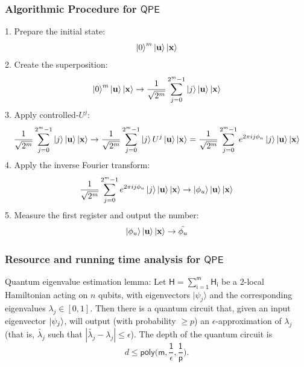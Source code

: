 \documentclass[11pt]{article}
\begin{document}
\subsubsection{Algorithmic Procedure for $\mathsf{QPE}$}
1. Prepare the initial state: $$\ket{0}^m\ket{\mathbf{u}}\ket{\mathbf{x}}$$
2. Create the superposition: $$\ket{0}^m\ket{\mathbf{u}}\ket{\mathbf{x}} \rightarrow  \frac{1}{\sqrt{2^m}} \sum_{j=0}^{2^m-1}\ket{j}\ket{\mathbf{u}}\ket{\mathbf{x}}$$
3. Apply controlled-$U^j$: $$\frac{1}{\sqrt{2^m}} \sum_{j=0}^{2^m-1}\ket{j}\ket{\mathbf{u}}\ket{\mathbf{x}} \rightarrow \frac{1}{\sqrt{2^m}} \sum_{j=0}^{2^m-1}\ket{j}U^j\ket{\mathbf{u}}\ket{\mathbf{x}}= \frac{1}{\sqrt{2^m}} \sum_{j=0}^{2^m-1}e^{2\pi ij\phi_u}\ket{j}\ket{\mathbf{u}}\ket{\mathbf{x}}$$
4. Apply the inverse Fourier transform: $$ \frac{1}{\sqrt{2^m}} \sum_{j=0}^{2^m-1}e^{2\pi ij\phi_u}\ket{j}\ket{\mathbf{u}}\ket{\mathbf{x}} \rightarrow \ket{\phi_u}\ket{\mathbf{u}}\ket{\mathbf{x}}$$
5. Measure the first register and output the number: $$ \ket{\phi_u}\ket{\mathbf{u}}\ket{\mathbf{x}} \rightarrow \tilde{\phi_u}$$
\subsubsection{Resource and running time analysis for $\mathsf{QPE}$}

\begin{lemma}
    Quantum eigenvalue estimation lemma: Let $\mathsf{H=\sum_{i=1}^{m}H_i}$ be a $2$-local Hamiltonian acting on $n$ qubits, with eigenvectors $|\psi_j\rangle$ and the corresponding eigenvalues $\lambda_j\in [0,1]$. Then there is a quantum circuit that, given an input eigenvector $\ket{\psi_j}$, will output (with probability $\geq p$) an $\epsilon$-approximation of $\lambda_j$ (that is, $\tilde{\lambda_j}$ such that $|\tilde{\lambda_j}-\lambda_j|\leq \epsilon$). The depth of the quantum circuit is 
    \begin{equation}
        d \leq \mathsf{poly\Big( m,\frac{1}{\epsilon},\frac{1}{p}\Big)}.
    \end{equation}
\end{lemma}

\end{document}

